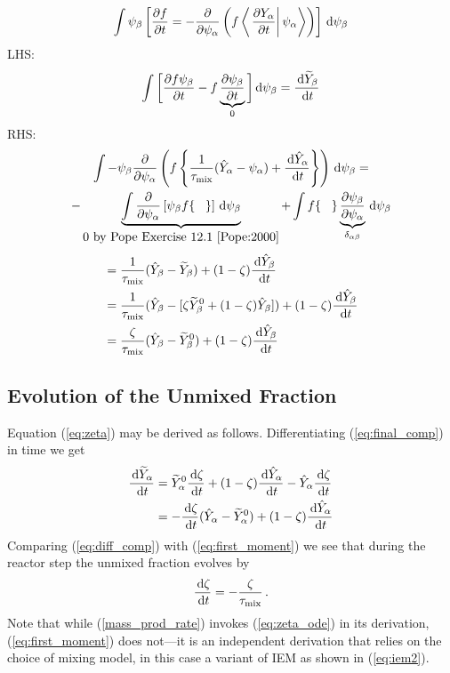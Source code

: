 \begin{align}
\int \psi_\beta \left[ \frac{\partial f}{\partial t} = - \frac{\partial}{\partial \psi_\alpha} \left( f \left\langle \left. \frac{\partial Y_\alpha}{\partial t} \right| \psi_\alpha \right\rangle \right) \right] \d \psi_\beta
\end{align}
LHS:
\begin{align}
\int \bigg[ \frac{\partial f \psi_\beta}{\partial t} - f \underbrace{\frac{\partial \psi_\beta}{\partial t}}_{0} \bigg] \d \psi_\beta = \frac{\d \widetilde{Y}_\beta}{\d t}
\end{align}
RHS:
\begin{multline}
\int - \psi_\beta \frac{\partial}{\partial \psi_\alpha} \left( f \left\{ \frac{1}{\tau_{\si{mix}}}(\hat{Y}_\alpha - \psi_\alpha) + \frac{\d \hat{Y}_\alpha}{\d t} \right\} \right) \d \psi_\beta =\\ - \underbrace{\int \frac{\partial}{\partial \psi_\alpha}\left[ \psi_\beta f \{ \;\;\; \} \right] \d \psi_\beta}_{\mbox{0 by Pope Exercise 12.1 \cite{Pope:2000}}} + \int f \{\;\;\;\} \underbrace{\frac{\partial \psi_\beta}{\partial \psi_\alpha}}_{\delta_{\alpha \beta}} \d \psi_\beta
\end{multline}
\begin{align}
&= \frac{1}{\tau_{\si{mix}}}(\hat{Y}_\beta - \widetilde{Y}_\beta) + (1-\zeta) \frac{\d \hat{Y}_\beta}{\d t} \notag\\
&= \frac{1}{\tau_{\si{mix}}}(\hat{Y}_\beta - [\zeta \widetilde{Y}_\beta^0 + (1-\zeta)\hat{Y}_\beta]) + (1-\zeta) \frac{\d \hat{Y}_\beta}{\d t} \notag\\
&= \frac{\zeta}{\tau_{\si{mix}}}(\hat{Y}_\beta - \widetilde{Y}_\beta^0) + (1-\zeta) \frac{\d \hat{Y}_\beta}{\d t} \label{eq:first_moment}
\end{align}

\subsection*{Evolution of the Unmixed Fraction}
\label{app:evo_unmixed}

Equation (\ref{eq:zeta}) may be derived as follows.  Differentiating (\ref{eq:final_comp}) in time we get
\begin{align}
\label{eq:diff_comp}
\frac{\d \widetilde{Y}_\alpha}{\d t}
&= \widetilde{Y}_\alpha^0 \frac{\d \zeta}{\d t} + (1-\zeta) \frac{\d \hat{Y}_\alpha}{\d t} - \hat{Y}_\alpha \frac{\d \zeta}{\d t} \notag\\
&= - \frac{\d \zeta}{\d t} (\hat{Y}_\alpha-\widetilde{Y}_\alpha^0) + (1-\zeta) \frac{\d \hat{Y}_\alpha}{\d t}
\end{align}
Comparing (\ref{eq:diff_comp}) with (\ref{eq:first_moment}) we see that during the reactor step the unmixed fraction evolves by
\begin{equation}
\label{eq:zeta_ode}
\frac{\d \zeta}{\d t} = - \frac{\zeta}{\tau_{\si{mix}}} \,\mbox{.}
\end{equation}
Note that while (\ref{mass_prod_rate}) invokes (\ref{eq:zeta_ode}) in its derivation, (\ref{eq:first_moment}) does not---it is an independent derivation that relies on the choice of mixing model, in this case a variant of IEM as shown in (\ref{eq:iem2}).




